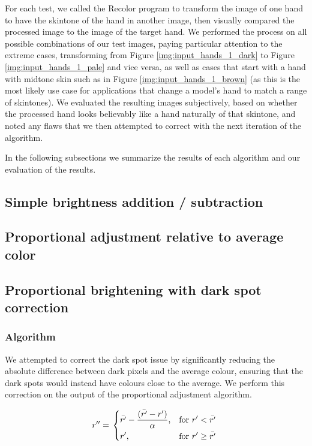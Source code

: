  For each test, we called the Recolor program to transform the image of one hand to have the skintone of the hand in another image, then visually compared the processed image to the image of the target hand. We performed the process on all possible combinations of our test images, paying particular attention to the extreme cases, transforming from Figure \ref{img:input_hands_1_dark} to Figure \ref{img:input_hands_1_pale} and vice versa, as well as cases that start with a hand with midtone skin such as in Figure \ref{img:input_hands_1_brown} (as this is the most likely use case for applications that change a model's hand to match a range of skintones). We evaluated the resulting images subjectively, based on whether the processed hand looks believably like a hand naturally of that skintone, and noted any flaws that we then attempted to correct with the next iteration of the algorithm.

In the following subsections we summarize the results of each algorithm and our evaluation of the results.

\subsection{Simple brightness addition / subtraction}


\subsection{Proportional adjustment relative to average color}


\subsection{Proportional brightening with dark spot correction}

\subsubsection*{Algorithm}
We attempted to correct the dark spot issue by significantly reducing the absolute difference between dark pixels and the average colour, ensuring that the dark spots would instead have colours close to the average. We perform this correction on the output of the proportional adjustment algorithm.

\begin{equation} \label{eq:prop_corr_algo}
  r'' = \left.
  \begin{dcases}
    \displaystyle \bar{r'} - \frac{(\bar{r'} - r')}{\alpha}, & \text{for } r' < \bar{r'} \\
    \displaystyle r', & \text{for } r' \geq \bar{r'} \\
  \end{dcases}
  \right.\\
\end{equation}

